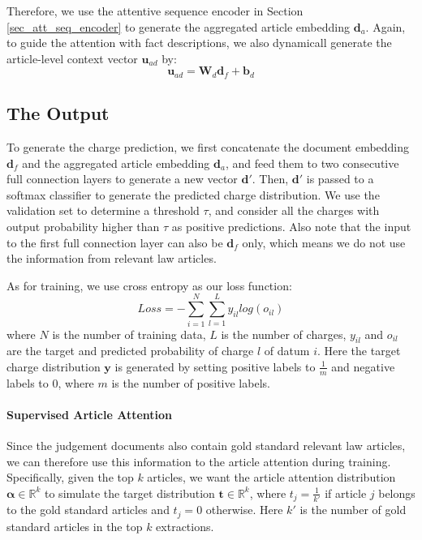 Therefore, we use the attentive sequence encoder in Section \ref{sec_att_seq_encoder} to generate the aggregated article embedding $\mathbf{d}_a$. Again, to guide the attention with fact descriptions, we also dynamicall generate the article-level context vector $\mathbf{u}_{ad}$ by:
\begin{equation}
\mathbf{u}_{ad} = \mathbf{W}_d \mathbf{d}_f + \mathbf{b}_d
\end{equation}


\subsection{The Output}
To generate the charge prediction, we first concatenate the document embedding $\mathbf{d}_f$ and the aggregated article embedding $\mathbf{d}_a$, and feed them to two consecutive full connection layers to generate a new vector $\mathbf{d}'$. Then, $\mathbf{d}'$ is passed to a softmax classifier to generate the predicted charge distribution. We use the validation set to determine a threshold $\tau$, and consider all the charges with output probability higher than $\tau$ as positive predictions.
Also note that the input to the first full connection layer can also be $\mathbf{d}_f$ only, which means we do not use the information from relevant law articles.

As for training, we use cross entropy as our loss function:
\begin{equation}
\label{original_loss}
Loss= -\sum_{i=1}^N\sum_{l=1}^L{y_{il} log(o_{il})}
\end{equation} 
where $N$ is the number of training data, $L$ is the number of charges, $y_{il}$ and $o_{il}$ are the target and predicted probability of charge $l$ of datum $i$. Here the target charge distribution $\mathbf{y}$ is generated by setting positive labels to $\frac{1}{m}$ and negative labels to $0$, where $m$ is the number of positive labels.

\paragraph{Supervised Article Attention}
Since the judgement documents also contain gold standard relevant law articles, we can therefore use this information to  the article attention during training. Specifically, given the top $k$ articles, we want the article attention distribution $\bm{\alpha}\in\mathbb{R}^k$ to simulate the target distribution $\mathbf{t}\in\mathbb{R}^k$, where $t_j=\frac{1}{k'}$ if article $j$ belongs to the gold standard articles and $t_j=0$ otherwise. Here $k'$ is the number of gold standard articles in the top $k$ extractions.

